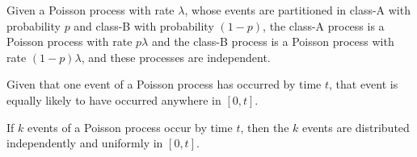 \begin{theorem}
\label{thm:Poisson-Splitting}	
	Given a Poisson process with rate $\lambda$, whose events are partitioned in class-A with probability $p$ and class-B with probability $(1-p)$, the class-A process is a Poisson process with rate $p \lambda$ and the class-B process is a Poisson process with rate $(1-p) \lambda$, and these processes are independent.
\end{theorem}

\begin{theorem}
\label{thm:Poisson-Uniformity-Single-Event}	
	Given that one event of a Poisson process has occurred by time $t$, that event is equally likely to have occurred anywhere in $[0,t]$. 
\end{theorem}

\begin{theorem}
\label{thm:Poisson-Uniformity-Multiple-Events}	
	If $k$ events of a Poisson process occur by time $t$, then the $k$ events are distributed independently and uniformly in $[0,t]$. 
\end{theorem}